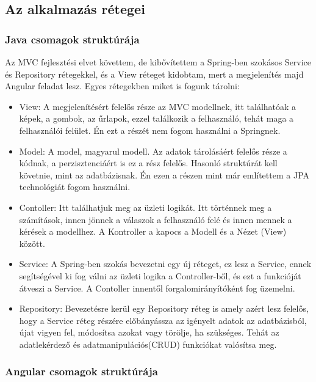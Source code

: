 \subsection{Az alkalmazás rétegei}

\subsubsection{Java csomagok struktúrája}

Az MVC fejlesztési elvet követtem, de kibővítettem a Spring-ben szokásos Service és Repository rétegekkel, és a View réteget kidobtam, mert a megjelenítés majd Angular feladat lesz. Egyes rétegekben miket is fogunk tárolni:
\begin{itemize}

\item View: A megjelenítésért felelős része az MVC modellnek, itt találhatóak a képek, a gombok, az űrlapok, ezzel találkozik a felhasználó, tehát maga a felhasználói felület. Én ezt a részét nem fogom használni a Springnek.

\item Model: A model, magyarul modell. Az adatok tárolásáért felelős része a kódnak, a perzisztenciáért is ez a rész felelős. Hasonló struktúrát kell követnie, mint az adatbázisnak. Én ezen a részen mint már említettem a JPA technológiát fogom használni.

\item Contoller: Itt találhatjuk meg az üzleti logikát. Itt történnek meg a számítások, innen jönnek a válaszok a felhasználó felé és innen mennek a kérések a modellhez. A Kontroller a kapocs a Modell és a Nézet (View) között.

\item Service: A Spring-ben szokás bevezetni egy új réteget, ez lesz a Service, ennek segítségével ki fog válni az üzleti logika a Controller-ből, és ezt a funkcióját átveszi a Service. A Contoller innentől forgalomirányítóként fog üzemelni.

\item Repository: Bevezetésre kerül egy Repository réteg is amely azért lesz felelős, hogy a Service réteg részére előbányássza az igényelt adatok az adatbázisból, újat vigyen fel, módosítsa azokat vagy törölje, ha szükséges. 
Tehát az adatlekérdező és adatmanipulációs(CRUD) funkciókat valósítsa meg.
\end{itemize}

\subsubsection{Angular csomagok struktúrája}

